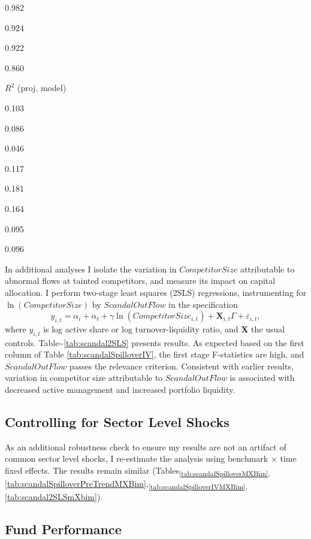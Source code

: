 \documentclass[]{book}
\theoremstyle{definition}
\theoremstyle{definition}
\theoremstyle{definition}
\theoremstyle{remark}
\begin{document}
0.982

0.924

0.922

0.860

\(R^2\) (proj. model)

0.103

0.086

0.046

0.117

0.181

0.164

0.095

0.096

In additional analyses I isolate the variation in \(CompetitorSize\)
attributable to abnormal flows at tainted competitors, and measure its
impact on capital allocation. I perform two-stage least squares (2SLS)
regressions, instrumenting for \(\ln(CompetitorSize)\) by
\(ScandalOutFlow\) in the specification \begin{equation}
    y_{i,t}=\alpha_i+\alpha_t + \gamma \ln(CompetitorSize_{i,t}) + \mathbf{X}_{i,t}\Gamma+\varepsilon_{i,t},
\end{equation} where \(y_{i,t}\) is log active share or log
turnover-liquidity ratio, and \(\mathbf{X}\) the usual controls.
Table\textasciitilde{}\ref{tab:scandal2SLS} presents results. As
expected based on the first column of Table
\ref{tab:scandalSpilloverIV}, the first stage F-statistics are high, and
\(ScandalOutFlow\) passes the relevance criterion. Consistent with
earlier results, variation in competitor size attributable to
\(ScandalOutFlow\) is associated with decreased active management and
increased portfolio liquidity.

\subsection{Controlling for Sector Level Shocks}

As an additional robustness check to ensure my results are not an
artifact of common sector level shocks, I re-estimate the analysis using
benchmark \(\times\) time fixed effects. The results remain similar
(Tables\textsubscript{\ref{tab:scandalSpilloverMXBim},}\ref{tab:scandalSpilloverPreTrendMXBim},\textsubscript{\ref{tab:scandalSpilloverIVMXBim},}\ref{tab:scandal2SLSmXbim}).

\subsection{Fund Performance}
\end{document}
